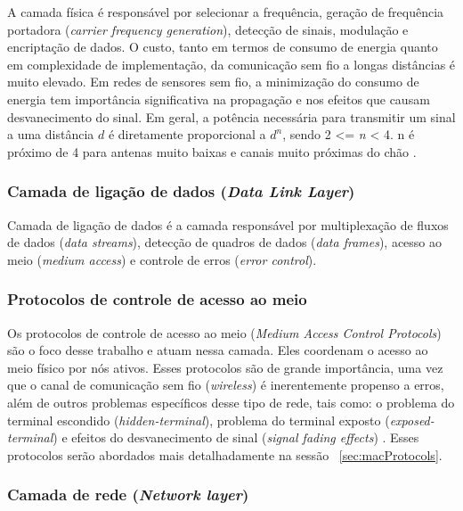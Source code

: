  A camada física é responsável por selecionar a frequência, geração de frequência portadora (\textit{carrier frequency generation}), detecção de sinais, modulação e encriptação de dados. O custo, tanto em termos de consumo de energia quanto em complexidade de implementação, da comunicação sem fio a longas distâncias é muito elevado. Em redes de sensores sem fio, a minimização do consumo de energia tem importância significativa na propagação e nos efeitos que causam desvanecimento do sinal. Em geral, a potência necessária para transmitir um sinal a uma distância \textit{$d$} é diretamente proporcional a \textit{$d^{n}$}, sendo 2 <= \textit{n} < 4. n é próximo de 4 para antenas muito baixas e canais muito próximas do chão \cite{Pottie2000}.
 
 \subsubsection{Camada de ligação de dados (\textit{Data Link Layer}) }
 
 Camada de ligação de dados é a camada responsável por multiplexação de fluxos de dados (\textit{data streams}), detecção de quadros de dados (\textit{data frames}), acesso ao meio (\textit{medium access}) e controle de erros (\textit{error control}).
 
 \subsubsection*{Protocolos de controle de acesso ao meio}
 
Os protocolos de controle de acesso ao meio (\textit{Medium Access Control Protocols}) são o foco desse trabalho e atuam nessa camada. Eles coordenam o acesso ao meio físico por nós ativos. Esses protocolos são de grande importância, uma vez que o canal de comunicação sem fio (\textit{wireless}) é inerentemente propenso a erros, além de outros problemas específicos desse tipo de rede, tais como: o problema do terminal escondido (\textit{hidden-terminal}), problema do terminal exposto (\textit{exposed-terminal}) e efeitos do desvanecimento de sinal (\textit{signal fading effects}) \cite{Kumar06mediumaccess}. Esses protocolos serão abordados mais detalhadamente na sessão ~\ref{sec:macProtocols}.

 
 \subsubsection{Camada de rede (\textit{Network layer})} 
 

